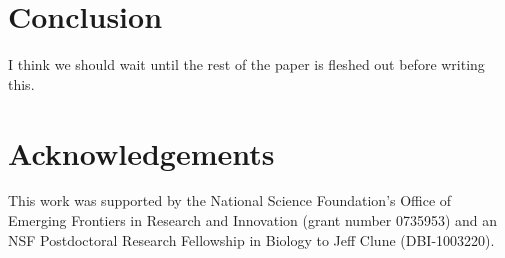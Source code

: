 \documentclass[letterpaper]{article}
\begin{document}
\section{Conclusion}

I think we should wait until the rest of the paper is fleshed out before writing this. 

\section{Acknowledgements}

This work was supported by the National Science Foundation's Office of
Emerging Frontiers in Research and Innovation (grant number 0735953) and an NSF Postdoctoral Research Fellowship in Biology to Jeff Clune (DBI-1003220).


\footnotesize


\end{document}

